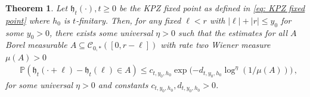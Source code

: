 \documentclass[11pt, reqno]{amsart}
\numberwithin{equation}{section}
\newcounter{dummy} \numberwithin{dummy}{section}
\newtheorem{theorem}[dummy]{Theorem}
\newcommand{\PP}{\ensuremath{\mathbb{P}}}
\begin{document}
\begin{theorem}\label{thm: KPZ reg finitary}
     Let $\mathfrak{h}_t(\cdot), t\ge 0$ be the KPZ fixed point as defined in \eqref{eq: KPZ fixed point}  where $h_0$ is $t$-finitary. Then, for any fixed $\ell<r$ with $|\ell|+ |r|\le y_0$ for some $y_0>0$, there exists some universal $\eta > 0$ such that the estimates for all $A$ Borel measurable $A\subseteq \mathscr{C}_{0,*}([0,r-\ell])$ with rate two Wiener measure $\mu(A) > 0$
\begin{equation}\label{eq: brown reg fin rate fn}
\begin{array}{cc}
     &\PP(\mathfrak{h}_t(\cdot + \ell)-\mathfrak{h}_t(\ell)\in A)\le c_{t, y_0, h_0}\exp\bigg({-d_{t, y_0, h_0}\log^{\eta} \left(1/\mu(A)\right)}\bigg)\,,
\end{array}
\end{equation} 
for some universal $\eta> 0$ and constants $c_{t, y_0, h_0}, d_{t, y_0, h_0}>0$.
\end{theorem}
\end{document}
